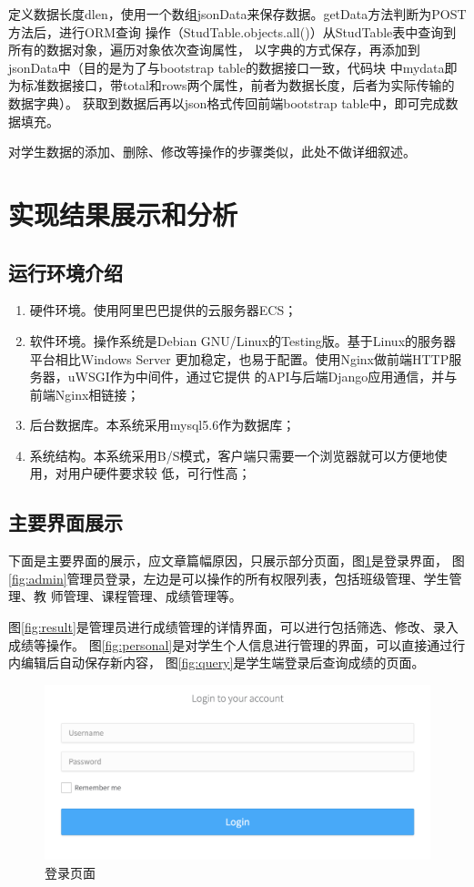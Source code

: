 \documentclass{ede}
\begin{document}
定义数据长度dlen，使用一个数组jsonData来保存数据。getData方法判断为POST方法后，进行ORM查询
操作（StudTable.objects.all()）从StudTable表中查询到所有的数据对象，遍历对象依次查询属性，
以字典的方式保存，再添加到jsonData中（目的是为了与bootstrap table的数据接口一致，代码块
中mydata即为标准数据接口，带total和rows两个属性，前者为数据长度，后者为实际传输的数据字典）。
获取到数据后再以json格式传回前端bootstrap table中，即可完成数据填充。

对学生数据的添加、删除、修改等操作的步骤类似，此处不做详细叙述。

\section{实现结果展示和分析}

\subsection{运行环境介绍}

\begin{enumerate}
\item 硬件环境。使用阿里巴巴提供的云服务器ECS；
\item 软件环境。操作系统是Debian GNU/Linux的Testing版。基于Linux的服务器平台相比Windows
  Server 更加稳定，也易于配置。使用Nginx做前端HTTP服务器，uWSGI作为中间件，通过它提供
  的API与后端Django应用通信，并与前端Nginx相链接；
\item 后台数据库。本系统采用mysql5.6作为数据库；
\item 系统结构。本系统采用B/S模式，客户端只需要一个浏览器就可以方便地使用，对用户硬件要求较
  低，可行性高；
\end{enumerate}

\subsection{主要界面展示}

下面是主要界面的展示，应文章篇幅原因，只展示部分页面，图\ref{fig:login}是登录界面，
图\ref{fig:admin}管理员登录，左边是可以操作的所有权限列表，包括班级管理、学生管理、教
师管理、课程管理、成绩管理等。

图\ref{fig:result}是管理员进行成绩管理的详情界面，可以进行包括筛选、修改、录入成绩等操作。
图\ref{fig:personal}是对学生个人信息进行管理的界面，可以直接通过行内编辑后自动保存新内容，
图\ref{fig:query}是学生端登录后查询成绩的页面。

\begin{figure}%
  \centering
  \includegraphics [width=.8\columnwidth]{./img/login}      
  \caption{登录页面}\label{fig:login}
\end{figure}
\end{document}
